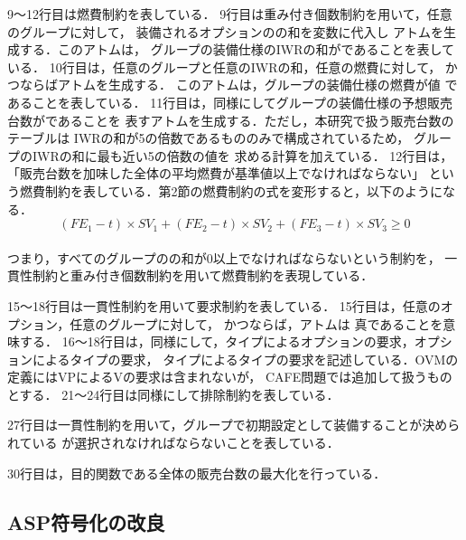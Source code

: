 9〜12行目は燃費制約を表している．
9行目は重み付き個数制約を用いて，任意のグループに対して，
装備されるオプションのの和を変数に代入し
アトムを生成する．このアトムは，
グループの装備仕様のIWRの和がであることを表している．
%
10行目は，任意のグループと任意のIWRの和，任意の燃費に対して，
かつならばアトムを生成する．
このアトムは，グループの装備仕様の燃費が値
であることを表している．
%
11行目は，同様にしてグループの装備仕様の予想販売台数がであることを
表すアトムを生成する．ただし，本研究で扱う販売台数のテーブルは
IWRの和が5の倍数であるもののみで構成されているため，
グループのIWRの和に最も近い5の倍数の値を
求める計算を加えている．
%
12行目は，「販売台数を加味した全体の平均燃費が基準値以上でなければならない」
という燃費制約を表している．第2節の燃費制約の式を変形すると，以下のようになる．
\\
\begin{displaymath}
 (FE_{1} - t) \times SV_{1} + (FE_{2} - t) \times SV_{2} + (FE_{3} - t)
 \times SV_{3} \geq 0
\end{displaymath}
\\
つまり，すべてのグループのの和が0以上でなければならないという制約を，
一貫性制約と重み付き個数制約を用いて燃費制約を表現している．

15〜18行目は一貫性制約を用いて要求制約を表している．
15行目は，任意のオプション，任意のグループに対して，
かつならば，アトムは
真であることを意味する．
16〜18行目は，同様にして，タイプによるオプションの要求，オプションによるタイプの要求，
タイプによるタイプの要求を記述している．OVMの定義にはVPによるVの要求は含まれないが，
CAFE問題では追加して扱うものとする．
21〜24行目は同様にして排除制約を表している．

27行目は一貫性制約を用いて，グループで初期設定として装備することが決められている
が選択されなければならないことを表している．

30行目は，目的関数である全体の販売台数の最大化を行っている．




\subsection{ASP符号化の改良}
 

